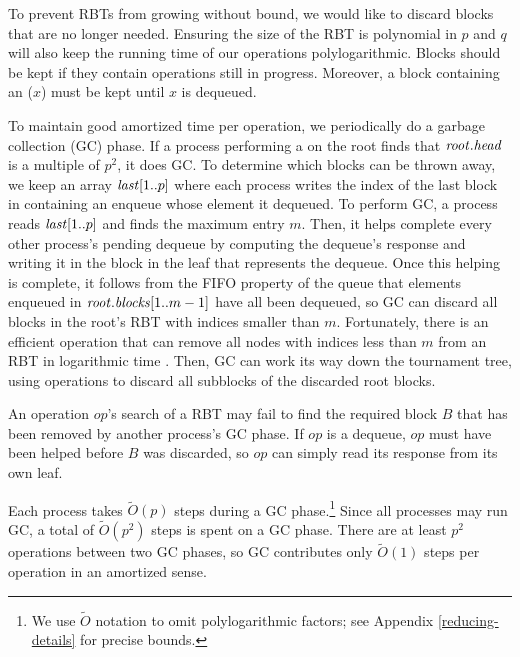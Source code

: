 To prevent RBTs from growing without bound, we would like to discard
blocks that are no longer needed.
Ensuring the size of the RBT is polynomial in $p$ and $q$ will 
also keep the running time of our operations polylogarithmic.
Blocks should be kept if they contain operations still in progress.
Moreover, a block containing an ($x$) must be kept until $x$ is dequeued.

To maintain good amortized time per operation, we periodically do a garbage collection (GC) phase.
If a process performing a  on the root finds that $\mbox{\textnormal{\textit{root}}}.\mbox{\textit{head}}$ is a multiple
of $p^2$, it does GC.
To determine which blocks can be thrown away, we keep an array $\mbox{\textnormal{\textit{last}}}[1..p]$ where 
each process writes the index of the last block in
 containing an enqueue whose element it dequeued.
To perform GC, a process reads $\mbox{\textnormal{\textit{last}}}[1..p]$ and finds the maximum entry $m$.
Then, it helps complete every other process's pending dequeue 
by computing the dequeue's response and writing it in the block in the leaf that represents the dequeue.
Once this helping is complete, it follows from the FIFO property of the queue that elements enqueued 
in $\mbox{\textnormal{\textit{root}}}.\mbox{\textit{blocks}}[1..m-1]$ have all been dequeued, so GC can discard all blocks in the root's RBT 
with indices smaller than $m$.
Fortunately, there is an efficient  operation that can remove
all nodes with indices less than $m$ from an RBT in logarithmic time \cite[Sec.~4.2]{Tar83}.
Then, GC can work its way down the tournament tree, using  operations to discard all subblocks
of the discarded root blocks.


An operation $op$'s search of a RBT may fail to find the required block $B$ that has been removed 
by another process's GC phase.  If $op$
is a dequeue, $op$ must have been helped before $B$ was discarded, so $op$ can simply read its response from
its own leaf.

Each process takes $\tilde{O}(p)$ steps during a GC phase.\footnote{We use $\tilde{O}$ notation
to omit polylogarithmic factors; see Appendix \ref{reducing-details} for precise bounds.}
Since all processes may run GC,
a total of $\tilde{O}(p^2)$ steps is spent on a GC phase.
There are at least $p^2$ operations between two GC phases,  so
GC contributes only $\tilde{O}(1)$ steps per operation in an amortized sense.

